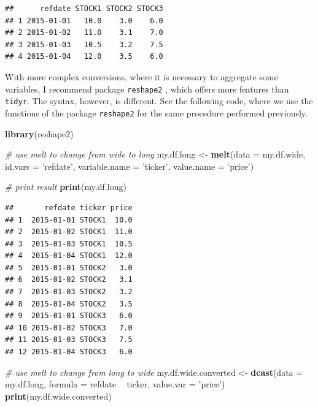 \documentclass[11pt,]{book}
\newenvironment{Shaded}{\begin{snugshade}}{\end{snugshade}}
\newcommand{\KeywordTok}[1]{\textcolor[rgb]{0.27,0.27,0.27}{\textbf{#1}}}
\newcommand{\DataTypeTok}[1]{\textcolor[rgb]{0.27,0.27,0.27}{#1}}
\newcommand{\StringTok}[1]{\textcolor[rgb]{0.5,0.5,0.5}{#1}}
\newcommand{\CommentTok}[1]{\textcolor[rgb]{0.56,0.35,0.01}{\textit{#1}}}
\newcommand{\OperatorTok}[1]{\textcolor[rgb]{0.81,0.36,0.00}{\textbf{#1}}}
\newcommand{\NormalTok}[1]{#1}
\begin{document}
\begin{verbatim}
##      refdate STOCK1 STOCK2 STOCK3
## 1 2015-01-01   10.0    3.0    6.0
## 2 2015-01-02   11.0    3.1    7.0
## 3 2015-01-03   10.5    3.2    7.5
## 4 2015-01-04   12.0    3.5    6.0
\end{verbatim}

With more complex conversions, where it is necessary to aggregate some
variables, I recommend package \texttt{reshape2}
\citep{wickham2007reshape2}, which offers more features than
\texttt{tidyr}. The syntax, however, is different. See the following
code, where we use the functions of the package \texttt{reshape2} for
the same procedure performed previously. 
 

\begin{Shaded}
\begin{Highlighting}[]
\KeywordTok{library}\NormalTok{(reshape2)}

\CommentTok{# use melt to change from wide to long}
\NormalTok{my.df.long <-}\StringTok{ }\KeywordTok{melt}\NormalTok{(}\DataTypeTok{data =}\NormalTok{ my.df.wide, }
                   \DataTypeTok{id.vars =} \StringTok{'refdate'}\NormalTok{, }
                   \DataTypeTok{variable.name =} \StringTok{'ticker'}\NormalTok{, }
                   \DataTypeTok{value.name =} \StringTok{'price'}\NormalTok{)}

\CommentTok{# print result                 }
\KeywordTok{print}\NormalTok{(my.df.long)}
\end{Highlighting}
\end{Shaded}

\begin{verbatim}
##       refdate ticker price
## 1  2015-01-01 STOCK1  10.0
## 2  2015-01-02 STOCK1  11.0
## 3  2015-01-03 STOCK1  10.5
## 4  2015-01-04 STOCK1  12.0
## 5  2015-01-01 STOCK2   3.0
## 6  2015-01-02 STOCK2   3.1
## 7  2015-01-03 STOCK2   3.2
## 8  2015-01-04 STOCK2   3.5
## 9  2015-01-01 STOCK3   6.0
## 10 2015-01-02 STOCK3   7.0
## 11 2015-01-03 STOCK3   7.5
## 12 2015-01-04 STOCK3   6.0
\end{verbatim}

\begin{Shaded}
\begin{Highlighting}[]
\CommentTok{# use melt to change from long to wide}
\NormalTok{my.df.wide.converted <-}\StringTok{ }\KeywordTok{dcast}\NormalTok{(}\DataTypeTok{data =}\NormalTok{ my.df.long, }
                              \DataTypeTok{formula =}\NormalTok{ refdate }\OperatorTok{~}\StringTok{ }\NormalTok{ticker, }
                              \DataTypeTok{value.var =} \StringTok{'price'}\NormalTok{)}
\KeywordTok{print}\NormalTok{(my.df.wide.converted)}
\end{Highlighting}
\end{Shaded}
\end{document}
